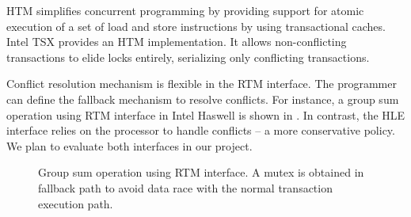 HTM simplifies concurrent programming by providing support for atomic execution
of a set of load and store instructions by using transactional caches. Intel TSX
provides an HTM implementation. It allows non-conflicting transactions to elide
locks entirely, serializing only conflicting transactions.

Conflict resolution mechanism is flexible in the RTM interface. The programmer
can define the fallback mechanism to resolve conflicts. For instance, a group
sum operation using RTM interface in Intel Haswell is shown in .
In contrast, the HLE interface relies on the processor to handle conflicts -- a
more conservative policy. We plan to evaluate both interfaces in our project.

 \begin{figure}
    \parbox[t]{0.45\textwidth}{} \caption{Group
        sum operation using RTM interface. A mutex is obtained in fallback path
to avoid data race with the normal transaction execution path.} \label{fig:rtm}
\end{figure}
